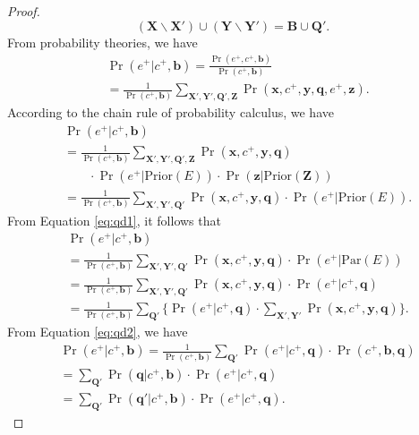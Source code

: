 \documentclass[twoside,leqno,twocolumn]{article}
\begin{document}
\begin{proof}
\begin{equation}
(\mathbf{X}\backslash \mathbf{X'})\cup (\mathbf{Y}\backslash \mathbf{Y'})=\mathbf{B}\cup \mathbf{Q'}.
\end{equation}
From probability theories, we have
\begin{equation*}
\begin{split}
& \Pr(e^{+}|c^{+},\mathbf{b})=\frac{\Pr(e^{+},c^{+},\mathbf{b})}{\Pr(c^{+},\mathbf{b})} \\
& =\frac{1}{\Pr(c^{+},\mathbf{b})} \sum_{\mathbf{X'},\mathbf{Y'},\mathbf{Q'},\mathbf{Z}}\Pr(\mathbf{x},c^{+},\mathbf{y},\mathbf{q},e^{+},\mathbf{z}).
\end{split}
\end{equation*}
According to the chain rule of probability calculus, we have
\begin{equation*}
\begin{split}
& \Pr(e^{+}|c^{+},\mathbf{b}) \\
& =\frac{1}{\Pr(c^{+},\mathbf{b})} \sum_{\mathbf{X'},\mathbf{Y'},\mathbf{Q'},\mathbf{Z}}\Pr(\mathbf{x},c^{+},\mathbf{y},\mathbf{q}) \\
& \qquad \cdot \Pr(e^{+}|\mathrm{Prior}(E))\cdot \Pr(\mathbf{z}|\mathrm{Prior}(\mathbf{Z})) \\
& =\frac{1}{\Pr(c^{+},\mathbf{b})} \sum_{\mathbf{X'},\mathbf{Y'},\mathbf{Q'}}\Pr(\mathbf{x},c^{+},\mathbf{y},\mathbf{q})\cdot \Pr(e^{+}|\mathrm{Prior}(E)).
\end{split}
\end{equation*}
From Equation \eqref{eq:qd1}, it follows that
\begin{equation*}
\begin{split}
& \Pr(e^{+}|c^{+},\mathbf{b}) \\
& =\frac{1}{\Pr(c^{+},\mathbf{b})} \sum_{\mathbf{X'},\mathbf{Y'},\mathbf{Q'}}\Pr(\mathbf{x},c^{+},\mathbf{y},\mathbf{q})\cdot \Pr(e^{+}|\mathrm{Par}(E)) \\
& =\frac{1}{\Pr(c^{+},\mathbf{b})} \sum_{\mathbf{X'},\mathbf{Y'},\mathbf{Q'}}\Pr(\mathbf{x},c^{+},\mathbf{y},\mathbf{q})\cdot \Pr(e^{+}|c^{+},\mathbf{q}) \\
& =\frac{1}{\Pr(c^{+},\mathbf{b})} \sum_{\mathbf{Q'}} \Big\{ \Pr(e^{+}|c^{+},\mathbf{q})\cdot \sum_{\mathbf{X'},\mathbf{Y'}}\Pr(\mathbf{x},c^{+},\mathbf{y},\mathbf{q}) \Big\}.
\end{split}
\end{equation*}
From Equation \eqref{eq:qd2}, we have
\begin{equation*}
\begin{split}
& \Pr(e^{+}|c^{+},\mathbf{b}) =\frac{1}{\Pr(c^{+},\mathbf{b})} \sum_{\mathbf{Q'}}\Pr(e^{+}|c^{+},\mathbf{q})\cdot \Pr(c^{+},\mathbf{b},\mathbf{q}) \\
& = \sum_{\mathbf{Q'}}\Pr(\mathbf{q}|c^{+},\mathbf{b})\cdot \Pr(e^{+}|c^{+},\mathbf{q}) \\
& = \sum_{\mathbf{Q'}}\Pr(\mathbf{q'}|c^{+},\mathbf{b})\cdot \Pr(e^{+}|c^{+},\mathbf{q}).
\end{split}
\end{equation*}


\end{proof}
\end{document}
